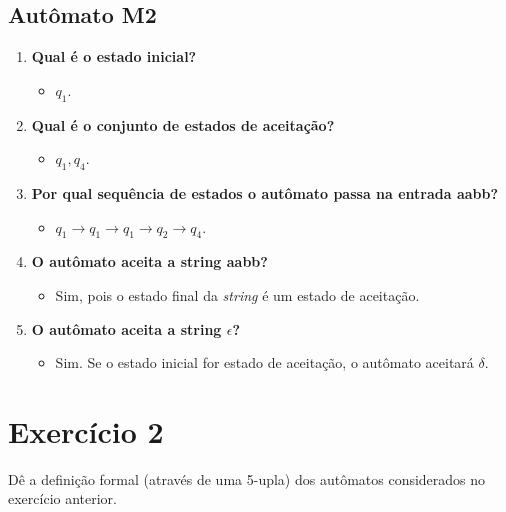 \documentclass[a4paper, 12pt]{article}
\begin{document}
\subsection{Autômato M2}
\begin{enumerate}
    \item \textbf{Qual é o estado inicial?}
    \begin{itemize}
        \item $q_1$.
    \end{itemize}
    
    
    \item \textbf{Qual é o conjunto de estados de aceitação?}
    \begin{itemize}
        \item ${q_1, q_4}$.
    \end{itemize}
    
    
    \item \textbf{Por qual sequência de estados o autômato passa na entrada aabb?}
    \begin{itemize}
        \item $q_1 \rightarrow q_1 \rightarrow q_1 \rightarrow q_2 \rightarrow q_4$.
    \end{itemize}
    
    
    \item \textbf{O autômato aceita a string aabb?}
    \begin{itemize}
        \item Sim, pois o estado final da \textit{string} é um estado de aceitação.
    \end{itemize}
    
    
    \item \textbf{O autômato aceita a string $\epsilon$?}
    \begin{itemize}
        \item Sim. Se o estado inicial for estado de aceitação, o autômato
            aceitará $\delta$.
    \end{itemize}
\end{enumerate}

\newpage
\section*{Exercício 2}

Dê a definição formal (através de uma 5-upla) dos autômatos considerados no exercício anterior.
\end{document}
